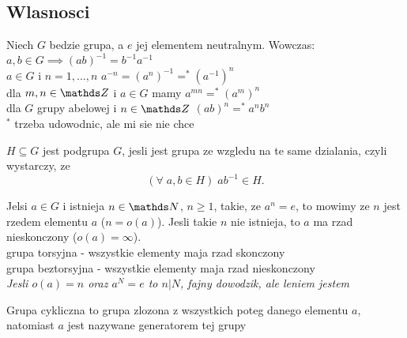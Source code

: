 \subsection{Wlasnosci}
\begin{multicols}{2}

    Niech $G$ bedzie grupa, a $e$ jej elementem neutralnym. Wowczas:\smallskip\\
    \point $a,b\in G\implies (ab)^{-1}=b^{-1}a^{-1}$\smallskip\\
    \point $a\in G$ i $n=1, ..., n$ $a^{-n} = (a^n)^{-1} =^* (a^{-1})^n$\smallskip\\
    \point dla $m,n\in\Z$ i $a\in G$ mamy $a^{mn}=^* (a^m)^n$\smallskip\\
    \point dla $G$ grupy abelowej i $n\in\Z$ $(ab)^n=^*a^nb^n$\smallskip\\
    $^*$ trzeba udowodnic, ale mi sie nie chce\medskip

    $H\subseteq G$ jest {\color{def}podgrupa} $G$, jesli jest grupa ze wzgledu na te same dzialania, czyli wystarczy, ze 
    $$(\forall\;a,b\in H)\; ab^{-1}\in H.$$

    \medskip

    Jelsi $a\in G$ i istnieja $n\in\N$, $n\geq 1$, takie, ze $a^n=e$, to mowimy ze $n$ jest {\color{def}rzedem elementu} $a$ ($n=o(a)$). Jesli takie $n$ nie istnieja, to $a$ ma {\color{acc}rzad nieskonczony} ($o(a)=\infty$).\smallskip\\
    {\color{acc}\point} {\color{def}grupa torsyjna} - wszystkie elementy maja rzad skonczony\smallskip\\
    {\color{acc}\point} {\color{def}grupa beztorsyjna} - wszystkie elementy maja rzad nieskonczony\smallskip\\
    \emph{Jesli $o(a) = n$ oraz $a^N=e$ to $n|N$, fajny dowodzik, ale leniem jestem}\medskip

    {\color{def}Grupa cykliczna} to grupa zlozona z wszystkich poteg danego elementu $a$, natomiast $a$ jest nazywane {\color{acc}generatorem} tej grupy

\end{multicols}

